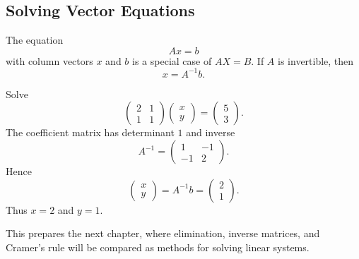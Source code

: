 \subsection{Solving Vector Equations}

The equation
\[
Ax=b
\]
with column vectors $x$ and $b$ is a special case of $AX=B$. If $A$ is invertible, then
\[
\boxed{x=A^{-1}b}.
\]

\begin{examplebox}
Solve
\[
\begin{pmatrix}2&1\\1&1\end{pmatrix}
\begin{pmatrix}x\\y\end{pmatrix}
=
\begin{pmatrix}5\\3\end{pmatrix}.
\]
The coefficient matrix has determinant $1$ and inverse
\[
A^{-1}=\begin{pmatrix}1&-1\\-1&2\end{pmatrix}.
\]
Hence
\[
\begin{pmatrix}x\\y\end{pmatrix}
=A^{-1}b
=\begin{pmatrix}2\\1\end{pmatrix}.
\]
Thus $x=2$ and $y=1$.
\end{examplebox}

This prepares the next chapter, where elimination, inverse matrices, and Cramer's rule will be compared as methods for solving linear systems.
